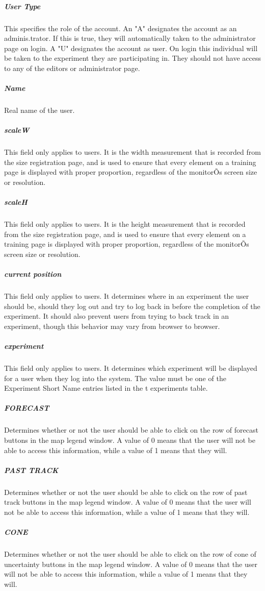 \documentclass[article]{ij4uq}              %
\begin{document}
\subparagraph{User Type}
This specifies the role of the account. An "A" designates the account as an adminis.trator. If this is true, they will automatically taken to the administrator page on login. A "U" designates the account as user. On login this individual will be taken to the experiment they are participating in. They should not have access to any of the editors or administrator page. 

\subparagraph{Name}
Real name of the user. 

\subparagraph{scaleW}
This field only applies to users. It is the width measurement that is recorded from the size registration page, and is used to ensure that every element on a training page is displayed with proper proportion, regardless of the monitorÕs screen size or resolution. 

\subparagraph{scaleH}
This field only applies to users. It is the height measurement that is recorded from the size registration page, and is used to ensure that every element on a training page is displayed with proper proportion, regardless of the monitorÕs screen size or resolution. 

\subparagraph{current position}
This field only applies to users. It determines where in an experiment the user should be, should they log out and try to log back in before the completion of the experiment. It should also prevent users from trying to back track in an experiment, though this behavior may vary from browser to browser. 

\subparagraph{experiment}
This field only applies to users. It determines which experiment will be displayed for a user when they log into the system. The value must be one of the Experiment Short Name entries listed in the t experiments table. 

\subparagraph{FORECAST}
Determines whether or not the user should be able to click on the row of forecast buttons in the map legend window. A value of 0 means that the user will not be able to access this information, while a value of 1 means that they will. 

\subparagraph{PAST TRACK}
Determines whether or not the user should be able to click on the row of past track buttons in the map legend window. A value of 0 means that the user will not be able to access this information, while a value of 1 means that they will. 

\subparagraph{CONE}
Determines whether or not the user should be able to click on the row of cone of uncertainty buttons in the map legend window. A value of 0 means that the user will not be able to access this information, while a value of 1 means that they will. 
\end{document}
